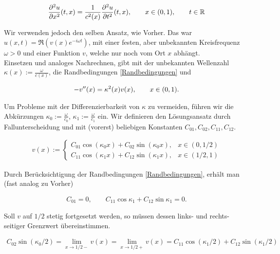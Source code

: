\begin{align*}
  \frac{\partial^2 u}{\partial x^2} (t, x) =
  \frac{1}{c^2(x)}
  \frac{\partial^2 u}{\partial t^2} (t, x), \qquad
  x \in (0, 1), \qquad
  t \in \mathbb{R}
\end{align*}

Wir verwenden jedoch den selben Ansatz, wie Vorher. Das war $u(x, t) = \mathfrak{R} (v(x) e^{-i \omega t})$, mit einer festen, aber unbekannten Kreisfrequenz $\omega > 0$ und einer Funktion $v$, welche nur noch vom Ort $x$ abhängt. \\

Einsetzen und analoges Nachrechnen, gibt mit der unbekannten Wellenzahl $\kappa(x) := \frac{\omega}{c(x)}$, die Randbedingungen \eqref{Randbedingungen} und

\begin{align} \label{Helmholz-Gleichung}
  -v^{\prime \prime}(x) = \kappa^2(x) v(x), \qquad
  x \in (0, 1).
\end{align}

Um Probleme mit der Differenzierbarkeit von $\kappa$ zu vermeiden, führen wir die Abkürzungen $\kappa_0 := \frac{\omega}{c_0}$, $\kappa_1 := \frac{\omega}{c_1}$ ein. Wir definieren den Lösungsansatz durch Fallunterscheidung und mit (vorerst) beliebigen Konstanten $C_{01}, C_{02}, C_{11}, C_{12}$.

\begin{align*}
  v(x) :=
  \begin{cases}
    C_{01} \cos{(\kappa_0 x)} + C_{02} \sin{(\kappa_0 x)},
    & x \in (0, 1/2) \\
    C_{11} \cos{(\kappa_1 x)} + C_{12} \sin{(\kappa_1 x)},
    & x \in (1/2, 1)
  \end{cases}
\end{align*}

Durch Berücksichtigung der Randbedingungen \eqref{Randbedingungen}, erhält man (fast analog zu Vorher)

\begin{align*}
  C_{01} = 0, \qquad
  C_{11} \cos{\kappa_1} + C_{12} \sin{\kappa_1} = 0.
\end{align*}

Soll $v$ auf $1/2$ stetig fortgesetzt werden, so müssen dessen links- und rechts-seitiger Grenzwert übereinstimmen.

\begin{align*}
  C_{02} \sin(\kappa_0/2)
  = \lim_{x \to 1/2-} v(x)
  = \lim_{x \to 1/2+} v(x)
  = C_{11} \cos(\kappa_1/2) + C_{12} \sin(\kappa_1/2)
\end{align*}

